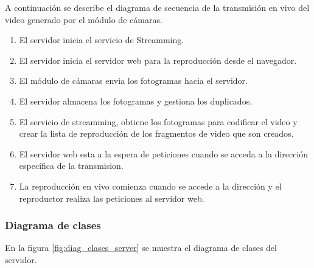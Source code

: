 A continuación se describe el diagrama de secuencia de la transmisión en vivo del video generado por el módulo de cámaras.

\begin{enumerate}
    \item El servidor inicia el servicio de Streamming.
    \item El servidor inicia el servidor web para la reproducción desde el navegador.
    \item El módulo de cámaras envia los fotogramas hacia el servidor.
    \item El servidor almacena los fotogramas y gestiona los duplicados.
    \item El servicio de streamming, obtiene los fotogramas para codificar el video y crear la lista de reproducción de los fragmentos de video que son creados.
    \item El servidor web esta a la espera de peticiones cuando se acceda a la dirección específica de la transmision.
    \item La reproducción en vivo comienza cuando se accede a la dirección y el reproductor realiza las peticiones al servidor web.
\end{enumerate}


\subsubsection{Diagrama de clases}
En la figura \ref{fig:diag_clases_server} se muestra el diagrama de clases del servidor.\\

